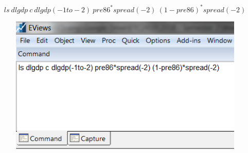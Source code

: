 \documentclass[12pt]{report}
\begin{document}
\noindent $$ls\ dlgdp\ c\ dlgdp(-1to-2)\ pre86^*spread(-2)\ (1-pre86)^*spread(-2)$$
\begin{figure}[H]
	\centerline{\includegraphics{tute11_49}}
\end{figure} \vspace{-\baselineskip}
\end{document}
